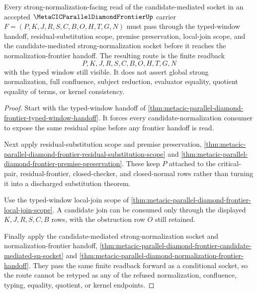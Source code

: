 \begin{theorem}
\label{thm:metacic-parallel-diamond-frontier-typed-window-candidate-sn-route}
Every strong-normalization-facing read of the candidate-mediated socket in an accepted $\MetaCICParallelDiamondFrontierUp$ carrier $F=(P,K,J,R,S,C,B,O,H,T,G,N)$ must pass through the typed-window handoff, residual-substitution scope, premise preservation, local-join scope, and the candidate-mediated strong-normalization socket before it reaches the normalization-frontier handoff. The resulting route is the finite readback
$$
P,K,J,R,S,C,B,O,H,T,G,N
$$
with the typed window still visible. It does not assert global strong normalization, full confluence, subject reduction, evaluator equality, quotient equality of terms, or kernel consistency.
\end{theorem}
\begin{proof}
Start with the typed-window handoff of \autoref{thm:metacic-parallel-diamond-frontier-typed-window-handoff}. It forces every candidate-normalization consumer to expose the same residual spine before any frontier handoff is read.

Next apply residual-substitution scope and premise preservation, \autoref{thm:metacic-parallel-diamond-frontier-residual-substitution-scope} and \autoref{thm:metacic-parallel-diamond-frontier-premise-preservation}. These keep $P$ attached to the critical-pair, residual-frontier, closed-checker, and closed-normal rows rather than turning it into a discharged substitution theorem.

Use the typed-window local-join scope of \autoref{thm:metacic-parallel-diamond-frontier-local-join-scope}. A candidate join can be consumed only through the displayed $K,J,R,S,C,B$ rows, with the obstruction row $O$ still retained.

Finally apply the candidate-mediated strong-normalization socket and normalization-frontier handoff, \autoref{thm:metacic-parallel-diamond-frontier-candidate-mediated-sn-socket} and \autoref{thm:metacic-parallel-diamond-normalization-frontier-handoff}. They pass the same finite readback forward as a conditional socket, so the route cannot be retyped as any of the refused normalization, confluence, typing, equality, quotient, or kernel endpoints.
\end{proof}

